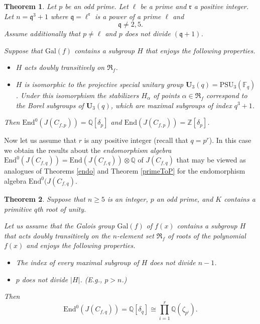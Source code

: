 \documentclass[12pt,a4paper,reqno]{amsart}
\def\Q{{\mathbb Q}}
\def\Z{{\mathbb Z}}
\def\R{{\mathbb R}}
\def\F{{\mathbb F}}
\def\R{{\mathfrak R}}
\def\Gal{\mathrm{Gal}}
\def\End{\mathrm{End}}
\newtheorem{thm}{Theorem}[section]
\theoremstyle{definition}
\newtheorem{rem}[thm]{Remark}
\begin{document}

 
  \begin{thm}
 \label{U3}
 Let $p$ be an odd prime.  Let $\ell$ be a prime and $\mathfrak{r}$ a positive integer.
 Let $n=\mathfrak{q}^3+1$ where $\mathfrak{q}=\ell^{\mathfrak{r}}$ is a power  of a prime $\ell$ and
 $$\mathfrak{q}\ne 2,5.$$
Assume additionally that  $p \ne \ell$ and $p$ does not divide $(\mathfrak{q}+1)$.
 
 Suppose that $\Gal(f)$ contains a subgroup $H$ that enjoys the following properties.
 
 \begin{itemize}
 \item
 $H$ acts doubly transitively on $\R_f$.
 \item
 $H$ is isomorphic  to the projective special unitary group $\mathbf{U}_3(q)=\mathrm{PSU}_3(\F_{q})$.
 Under this isomorphism the stabilizers $H_{\alpha}$ of points $\alpha \in \R_f$ correspond to the Borel subgroups of $\mathbf{U}_3(q)$, which are maximal subgroups of index $q^3+1$.
 \end{itemize}
 Then $\End^0(J(C_{f,p}))=\Q[\delta_p]$ and $\End(J(C_{f,p}))=\Z[\delta_p]$.
\end{thm}
 
 

Now let us assume that $r$ is any positive integer (recall that $q=p^r$). In this case we obtain the results about the {\sl endomorphism algebra} $\End^0(J(C_{f,q}))=\End(J(C_{f,q}))\otimes \Q$
of $J(C_{f,q})$
that may be viewed as analogues of Theorems \ref{endo} and Theorem \ref{primeToP} for the endomorphism algebra  $\End^0(J(C_{f,q})$.

\begin{thm}
\label{primeToQ}
Suppose that $n \ge 5$ is an integer, $p$ an odd prime, and  $K$ contains a primitive $q$th root of unity.

Let us assume that the Galois group $\Gal(f)$ of $f(x)$ contains a subgroup $H$  that acts doubly transitively
on the  $n$-element set $\R_f$ of roots of the polynomial $f(x)$ and enjoys the following properties.
\begin{itemize}
\item[(i)]
 The index of every maximal subgroup of  $H$  does not divide $n-1$.
\item[(ii)]
 $p$   does not divide  $|H|$. (E.g., $p>n$.)
\end{itemize}


Then 
$$\End^0(J(C_{f,q}))=\Q[\delta_q]\cong \prod_{i=1}^r \Q(\zeta_{p^i}).$$
 \end{thm}
\end{document}
